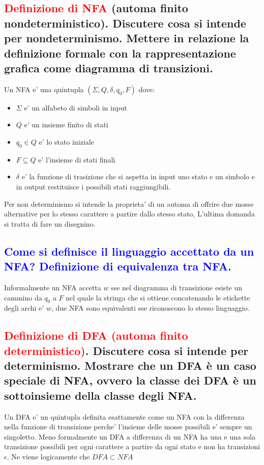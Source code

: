 \documentclass{article}
\begin{document}
\subsection{\textcolor{red}{Definizione di NFA} (automa finito nondeterministico). Discutere cosa si intende per nondeterminismo.
    Mettere in relazione la definizione formale con la rappresentazione grafica come diagramma di transizioni.}
Un NFA e' una quintupla $(\Sigma, Q, \delta, q_0, F)$ dove:
\begin{itemize}
    \item $\Sigma$ e' un alfabeto di simboli in input
    \item $Q$ e' un insieme finito di stati
    \item $q_0 \in Q$ e' lo stato iniziale
    \item $F \subseteq Q$ e' l'insieme di stati finali
    \item $\delta$ e' la funzione di trasizione che si aspetta in input uno stato e un simbolo e in output restituisce i possibili stati raggiungibili.
\end{itemize}
Per non determinismo si intende la proprieta' di un automa di offrire due mosse alternative per lo stesso carattere a partire dallo stesso stato,
L'ultima domanda si tratta di fare un disegnino.

\subsection{\textcolor{blue}{Come si definisce il linguaggio accettato da un NFA? Definizione di equivalenza tra NFA.}}
Informalmente un NFA accetta $w$ sse nel diagramma di transizione esiste un cammino da $q_0$ a $F$  nel quale la stringa che si ottiene concatenando le etichette degli archi e' $w$,
due NFA sono equivalenti sse riconoscono lo stesso linguaggio.

\subsection{\textcolor{red}{Definizione di DFA (automa finito deterministico)}. Discutere cosa si intende per determinismo. Mostrare che un DFA è un caso speciale di NFA, ovvero la classe dei DFA è un sottoinsieme della classe degli NFA.}
Un DFA e' un quintupla definita esattamente come un NFA con la differenza nella funzione di transizione perche' l'insieme delle mosse possibili e' sempre un singoletto. Meno formalmente un DFA a differenza
di un NFA ha una e una sola transizione possibili per ogni carattere a partire da ogni stato e non ha transizioni $\epsilon$. Ne viene logicamente che $DFA \subset NFA$
\end{document}
